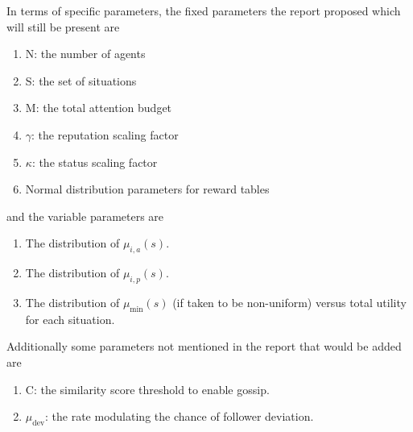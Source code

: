 \documentclass[12pt]{article}
\begin{document}
In terms of specific parameters, the fixed parameters the report proposed which will still be present are
\begin{enumerate}
    \item[1] N: the number of agents
    \item[2] S: the set of situations
    \item[3] M: the total attention budget
    \item[4] $\gamma$: the reputation scaling factor
    \item[5] $\kappa$: the status scaling factor
    \item[6] Normal distribution parameters for reward tables 
\end{enumerate}
and the variable parameters are
\begin{enumerate}
    \item[1] The distribution of $\mu_{i, a}(s)$.
    \item[2] The distribution of $\mu_{i, p}(s)$.
    \item[3] The distribution of $\mu_{\text{min}}(s)$ (if taken to be non-uniform) versus total utility for each situation.
\end{enumerate}
Additionally some parameters not mentioned in the report that would be added are
\begin{enumerate}
    \item[1] C: the similarity score threshold to enable gossip.
    \item[2] $\mu_{\text{dev}}$: the rate modulating the chance of follower deviation. 
\end{enumerate}
\end{document}
